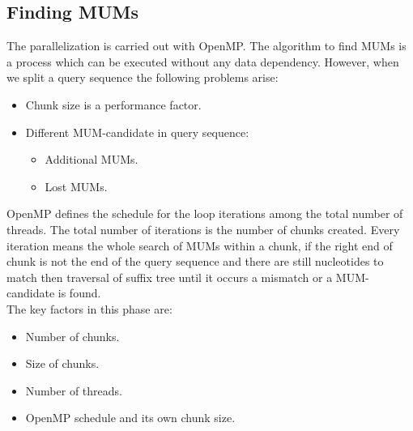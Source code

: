 \documentclass[3p,times]{elsarticle}
\begin{document}
\subsection*{Finding MUMs}
The parallelization is carried out with OpenMP. The algorithm to find MUMs is a process which can be executed without any data dependency. However, when we split a query sequence the following problems arise:
\begin{itemize}
  \item Chunk size is a performance factor.
  \item Different MUM-candidate in query sequence:
    \begin{itemize}
      \item Additional MUMs.
      \item Lost MUMs.
    \end{itemize}
\end{itemize}
OpenMP defines the schedule for the loop iterations among the total number of threads. The total number of iterations is the number of chunks created. Every iteration means the whole search of MUMs within a chunk, if the right end of chunk is not the end of the query sequence and there are still nucleotides to match then traversal of suffix tree until it occurs a mismatch or a MUM-candidate is found.\\
The key factors in this phase are:
\begin{itemize}
  \item Number of chunks.
  \item Size of chunks.
  \item Number of threads.
  \item OpenMP schedule and its own chunk size.
\end{itemize}
\end{document}
